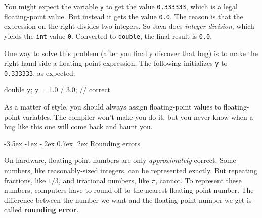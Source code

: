 \documentclass[12pt]{book}
\makeatletter
\renewcommand{\section}{\@startsection {section}{1}{\z@}%
    {-3.5ex \@plus -1ex \@minus -.2ex}%
    {0.7ex \@plus.2ex}%
    {\normalfont\Large\bfseries}}
\theoremstyle{exercise}
\newcommand{\java}[1]{\lstinline{#1}} %
\makeatother
\begin{document}
You might expect the variable \java{y} to get the value \java{0.333333}, which is a legal floating-point value.
But instead it gets the value \java{0.0}.
The reason is that the expression on the right divides two integers.
So Java does {\em integer division}, which yields the \java{int} value \java{0}.
Converted to \java{double}, the final result is \java{0.0}.

One way to solve this problem (after you finally discover that bug) is to make the right-hand side a floating-point expression.
The following initializes \java{y} to \java{0.333333}, as expected:

\begin{code}
    double y;
    y = 1.0 / 3.0;  // correct
\end{code}

As a matter of style, you should always assign floating-point values to floating-point variables.
The compiler won't make you do it, but you never know when a bug like this one will come back and haunt you.


\section{Rounding errors}



On hardware, floating-point numbers are only {\it approximately} correct.
Some numbers, like reasonably-sized integers, can be represented exactly.
But repeating fractions, like $1/3$, and irrational numbers, like $\pi$, cannot.
To represent these numbers, computers have to round off to the nearest floating-point number.
The difference between the number we want and the floating-point number we get is called {\bf rounding error}.


\end{document}
